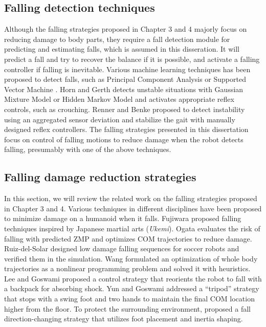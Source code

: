 \subsection{Falling detection techniques}
Although the falling strategies proposed in Chapter 3 and 4 majorly
focus on reducing damage to body parts, they require a fall detection module
for predicting and estimating falls, which is assumed in this disseration.
It will predict a fall and try to recover the balance if it is possible,
and activate a falling controller if falling is inevitable.
Various machine learning techniques has been proposed to detect falls, such as
Principal Component Analysis \cite{Karssen:2008:FDW} or 
Supported Vector Machine \cite{Kim:2011:MLA}.
Horn and Gerth \cite{Hohn:2009:PBM} detects unstable situations with
Gaussian Mixture Model or Hidden Markov Model
and activates appropriate reflex controls, such as crouching. 
Renner and Benke \cite{Renner:2006:IDF} proposed to detect instability using
an aggregated sensor deviation and stabilize the gait with manually designed
reflex controllers. 
The falling strategies presented in this dissertation focus
on control of falling motions to reduce damage when the
robot detects falling, presumably with one of the above techniques. 

\subsection{Falling damage reduction strategies}
In this section, we will review the related work on the falling
strategies proposed in Chapter 3 and 4.
Various techniques in different disciplines have been proposed to minimize
damage on a humanoid when it falls.
Fujiwara \etal
\cite{Fujiwara:2002:UFM,Fujiwara:2003:FHH,Fujiwara:2006:TOF,Fujiwara:2007:OPF}
proposed falling techniques inspired by Japanese martial arts (\emph{Ukemi}).
Ogata \etal \cite{Ogata:2007:FMC,Ogata:2008:RSG} evaluates the risk of falling with
predicted ZMP and optimizes COM trajectories to reduce damage. 
Ruiz-del-Solar \etal \cite{Ruiz:2009:LTF,Ruiz:2010:FDM} designed low damage
falling sequences for soccer robots and verified them in the simulation. 
Wang \etal \cite{Wang:2012:WTO} formulated an optimization of whole body
trajectories as a nonlinear programming problem and solved it with heuristics.
Lee and Goswami \cite{Lee:2012:FOB} proposed a control strategy that
reorients the robot to fall with a backpack for absorbing shock. 
Yun and Goswami \cite{Yun:2014:TFC} addressed a ``tripod'' strategy that
stops with a swing foot and two hands to maintain the final COM location
higher from the floor.   
To protect the surrounding environment, \cite{Goswami:2014:DCF} proposed a
fall direction-changing strategy that utilizes foot placement and inertia
shaping.

